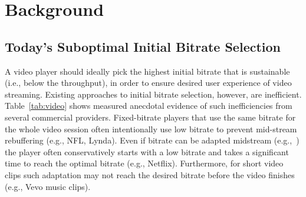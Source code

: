 \section{Background}
\label{sec:dda:back}

\subsection{Today's Suboptimal Initial Bitrate Selection}

A video player should ideally pick the highest initial bitrate
that is sustainable (i.e., below the throughput), in order to ensure desired user experience of video
streaming. Existing approaches to initial bitrate selection, however, are
inefficient. Table~\ref{tab:video} shows measured anecdotal evidence of such
inefficiencies from several commercial providers.  Fixed-bitrate players that
use the same bitrate for the whole video session often intentionally use low
bitrate to prevent mid-stream rebuffering (e.g., NFL, Lynda). Even if bitrate
can be adapted midstream (e.g.,~\cite{dash,netflix,festive}) the player often
conservatively starts with a low bitrate and takes a significant time to reach
the optimal bitrate (e.g., Netflix).  Furthermore, for short video clips such
adaptation may not reach the desired bitrate before the video finishes (e.g., Vevo music clips).

